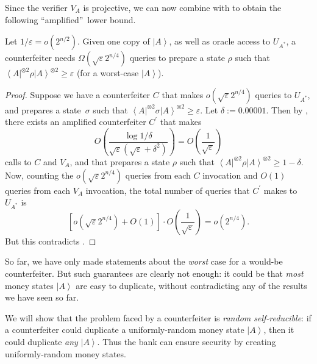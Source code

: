 Since the verifier $V_{A}$ is projective, we can now combine  with  to obtain the following
\textquotedblleft amplified\textquotedblright\ lower bound.

\begin{corollary}
\label{largeerrror}Let
$1/\varepsilon=o\left(  2^{n/2}\right)  $. Given one copy of $\left\vert
A\right\rangle $, as well as oracle access to $U_{A^{\ast}}$, a counterfeiter
needs $\Omega\left(  \sqrt{\varepsilon}2^{n/4}\right)  $ queries to prepare a
state $\rho$ such that $\left\langle A\right\vert ^{\otimes2}\rho\left\vert
A\right\rangle ^{\otimes2}\geq\varepsilon$ (for a worst-case $\left\vert
A\right\rangle $).
\end{corollary}

\begin{proof}
Suppose we have a counterfeiter $C$ that makes $o\left(  \sqrt{\varepsilon
}2^{n/4}\right)  $ queries to $U_{A^{\ast}}$, and prepares a state\ $\sigma
$ such that $\left\langle A\right\vert ^{\otimes2}\sigma\left\vert
A\right\rangle ^{\otimes2}\geq\varepsilon$. Let $\delta:=0.00001$. Then by
, there exists an amplified counterfeiter $C^{\prime}%
$ that makes%
\[
O\left(  \frac{\log1/\delta}{\sqrt{\varepsilon}\left(  \sqrt{\varepsilon
}+\delta^{2}\right)  }\right)  =O\left(  \frac{1}{\sqrt{\varepsilon}}\right)
\]
calls to $C$ and $V_{A}$, and that prepares a state $\rho$ such that
$\left\langle A\right\vert ^{\otimes2}\rho\left\vert A\right\rangle
^{\otimes2}\geq1-\delta$. Now, counting the $o\left(  \sqrt{\varepsilon
}2^{n/4}\right)  $ queries from each $C$ invocation and $O\left(  1\right)
$ queries from each $V_{A}$ invocation, the total number of queries that
$C^{\prime}$ makes to $U_{A^{\ast}}$ is%
\[
\left[  o\left(  \sqrt{\varepsilon}2^{n/4}\right)  +O\left(  1\right)
\right]  \cdot O\left(  \frac{1}{\sqrt{\varepsilon}}\right)  =o\left(
2^{n/4}\right)  .
\]
But this contradicts .
\end{proof}

So far, we have only made statements about the \emph{worst} case for a
would-be counterfeiter. But such guarantees are clearly not enough: it could
be that \emph{most} money states $\left\vert A\right\rangle $ are easy to
duplicate, without contradicting any of the results we have seen so far.

We will show that the problem faced by a counterfeiter is \emph{random
self-reducible}: if a counterfeiter could duplicate a uniformly-random money
state $\left\vert A\right\rangle $, then it could duplicate \emph{any}
$\left\vert A\right\rangle $. Thus the bank can ensure security by creating
uniformly-random money states.

